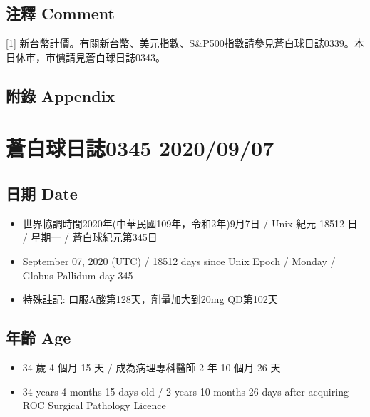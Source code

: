\documentclass[a5paper, 11pt
]{book}
\providecommand{\tightlist}{%
  \setlength{\itemsep}{0pt}\setlength{\parskip}{0pt}}
\begin{document}
\hypertarget{ux6ce8ux91cb-comment-5}{%
\subsection{注釋 Comment}\label{ux6ce8ux91cb-comment-5}}

{[}1{]}
新台幣計價。有關新台幣、美元指數、S\&P500指數請參見蒼白球日誌0339。本日休市，市價請見蒼白球日誌0343。

\hypertarget{ux9644ux9304-appendix-5}{%
\subsection{附錄 Appendix}\label{ux9644ux9304-appendix-5}}

\hypertarget{ux84bcux767dux7403ux65e5ux8a8c0345-20200907}{%
\section{蒼白球日誌0345
2020/09/07}\label{ux84bcux767dux7403ux65e5ux8a8c0345-20200907}}

\hypertarget{ux65e5ux671f-date-6}{%
\subsection{日期 Date}\label{ux65e5ux671f-date-6}}

\begin{itemize}
\tightlist
\item
  世界協調時間2020年(中華民國109年，令和2年)9月7日 / Unix 紀元 18512 日
  / 星期一 / 蒼白球紀元第345日
\item
  September 07, 2020 (UTC) / 18512 days since Unix Epoch / Monday /
  Globus Pallidum day 345
\item
  特殊註記: 口服A酸第128天，劑量加大到20mg QD第102天
\end{itemize}

\hypertarget{ux5e74ux9f61-age-6}{%
\subsection{年齡 Age}\label{ux5e74ux9f61-age-6}}

\begin{itemize}
\tightlist
\item
  34 歲 4 個月 15 天 / 成為病理專科醫師 2 年 10 個月 26 天
\item
  34 years 4 months 15 days old / 2 years 10 months 26 days after
  acquiring ROC Surgical Pathology Licence
\end{itemize}
\end{document}
